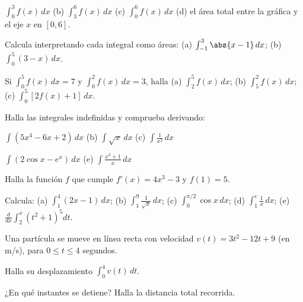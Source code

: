 \documentclass[11pt,a4paper]{article}
\newcommand{\dx}{\,dx}
\begin{document}
\begin{ejercicios}
  \begin{center}
  \end{center}
  \begin{ejercicios}
  \item $\int_0^3 f(x)\dx$ \quad (b) $\int_3^6 f(x)\dx$ \quad (c) $\int_0^6 f(x)\dx$ \quad (d) el área total entre la
    gráfica y el eje $x$ en $[0,6]$.
  \end{ejercicios}
\item Calcula interpretando cada integral como áreas: (a) $\int_{-1}^{3}\abs{x-1}\dx$; (b) $\int_0^5(3-x)\dx$.
\item Si $\int_0^5 f(x)\dx=7$ y $\int_0^2 f(x)\dx=3$, halla (a) $\int_2^5 f(x)\dx$; (b) $\int_5^2 f(x)\dx$;
  (c) $\int_0^5\left[2f(x)+1\right]\dx$.
\item Halla las integrales indefinidas y comprueba derivando:
  \begin{ejercicios}
  \item $\int\left(5x^{4}-6x+2\right)\dx$ \quad (b) $\int\sqrt{x}\dx$ \quad (c) $\int\frac{1}{x^{2}}\dx$
  \item[(d)] $\int\left(2\cos x-e^{x}\right)\dx$ \quad (e) $\int\frac{x^{2}+1}{x}\dx$
  \end{ejercicios}
\item Halla la función $f$ que cumple $f'(x)=4x^{3}-3$ y $f(1)=5$.
\item Calcula: (a) $\int_1^4(2x-1)\dx$; (b) $\int_1^9\frac{1}{\sqrt{x}}\dx$; (c) $\int_0^{\pi/2}\cos x\dx$;
  (d) $\int_1^{e}\frac{1}{x}\dx$; (e) $\frac{d}{dx}\int_2^{x}\left(t^{2}+1\right)^{5}dt$.
\item Una partícula se mueve en línea recta con velocidad $v(t)=3t^{2}-12t+9$ (en \si{m/s}), para $0\le t\le4$ segundos.
  \begin{ejercicios}
  \item Halla su desplazamiento $\int_0^4 v(t)\,dt$.
  \item ¿En qué instantes se detiene? Halla la distancia total recorrida.
  \end{ejercicios}
\end{ejercicios}
\end{document}
